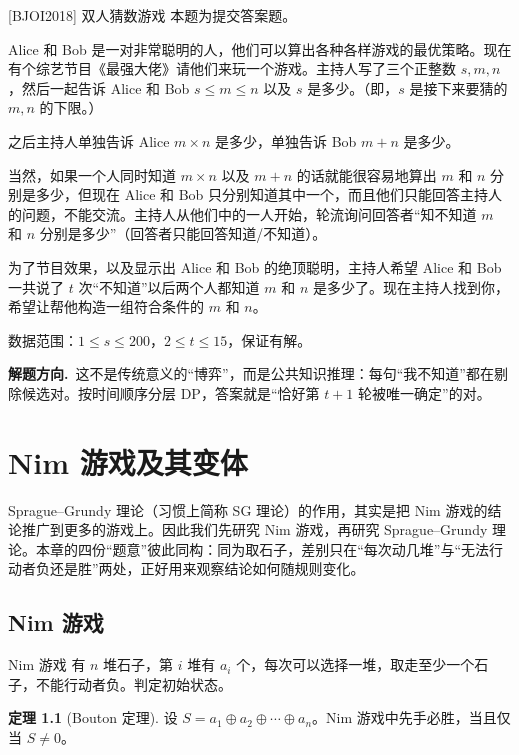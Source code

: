 \documentclass[UTF8,a4paper,11pt,oneside,openany,fontset=fandol]{ctexbook}
\theoremstyle{definition}
\newtheorem{theorem}[definition]{定理}
\newcommand{\hint}{\par\noindent\textbf{解题方向.}\ }
\begin{document}
\begin{problem}{[BJOI2018] 双人猜数游戏}
本题为提交答案题。

Alice 和 Bob 是一对非常聪明的人，他们可以算出各种各样游戏的最优策略。现在有个综艺节目《最强大佬》请他们来玩一个游戏。主持人写了三个正整数 $s,m,n$，然后一起告诉 Alice 和 Bob $s\le m\le n$ 以及 $s$ 是多少。（即，$s$ 是接下来要猜的 $m,n$ 的下限。）

之后主持人单独告诉 Alice $m\times n$ 是多少，单独告诉 Bob $m+n$ 是多少。

当然，如果一个人同时知道 $m\times n$ 以及 $m+n$ 的话就能很容易地算出 $m$ 和 $n$ 分别是多少，但现在 Alice 和 Bob 只分别知道其中一个，而且他们只能回答主持人的问题，不能交流。主持人从他们中的一人开始，轮流询问回答者“知不知道 $m$ 和 $n$ 分别是多少”（回答者只能回答知道/不知道）。

为了节目效果，以及显示出 Alice 和 Bob 的绝顶聪明，主持人希望 Alice 和 Bob 一共说了 $t$ 次“不知道”以后两个人都知道 $m$ 和 $n$ 是多少了。现在主持人找到你，希望让帮他构造一组符合条件的 $m$ 和 $n$。

数据范围：$1\le s\le200$，$2\le t\le15$，保证有解。
\end{problem}

\hint 这不是传统意义的“博弈”，而是公共知识推理：每句“我不知道”都在剔除候选对。按时间顺序分层 DP，答案就是“恰好第 $t+1$ 轮被唯一确定”的对。

\chapter{Nim 游戏及其变体}
Sprague--Grundy 理论（习惯上简称 SG 理论）的作用，其实是把 Nim 游戏的结论推广到更多的游戏上。因此我们先研究 Nim 游戏，再研究 Sprague--Grundy 理论。本章的四份“题意”彼此同构：同为取石子，差别只在“每次动几堆”与“无法行动者负还是胜”两处，正好用来观察结论如何随规则变化。

\section{Nim 游戏}
\begin{problem}{Nim 游戏}
有 $n$ 堆石子，第 $i$ 堆有 $a_i$ 个，每次可以选择一堆，取走至少一个石子，不能行动者负。判定初始状态。
\end{problem}

\begin{theorem}[Bouton 定理]\label{thm:bouton}
设 $S=a_1\oplus a_2\oplus\cdots\oplus a_n$。Nim 游戏中先手必胜，当且仅当 $S\ne0$。
\end{theorem}
\end{document}
